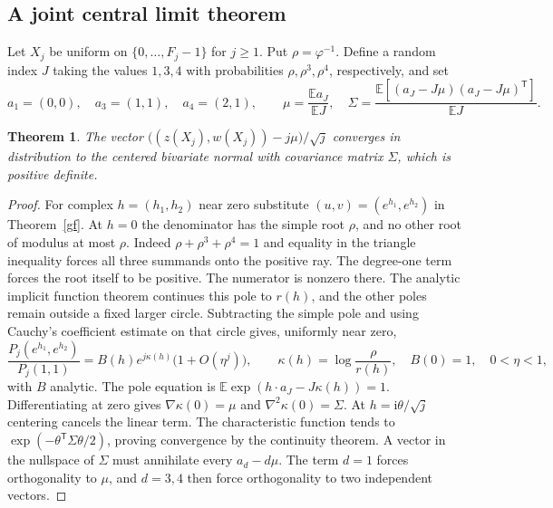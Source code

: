 \documentclass[10pt]{article}
\newtheorem{theorem}{Theorem}[section]
\newcommand{\ph}{\varphi}
\newcommand{\E}{\mathbb E}
\begin{document}
\subsection*{A joint central limit theorem}
Let $X_j$ be uniform on $\{0,\ldots,F_j-1\}$ for $j\ge1$. Put $\rho=\ph^{-1}$. Define a random index $J$ taking the values $1,3,4$ with probabilities $\rho,\rho^3,\rho^4$, respectively, and set
\[
 a_1=(0,0),\quad a_3=(1,1),\quad a_4=(2,1),\qquad
 \mu=\frac{\E a_J}{\E J},\quad
 \Sigma=\frac{\E[(a_J-J\mu)(a_J-J\mu)^{\mathsf T}]}{\E J}.
\]
\begin{theorem}\label{clt}
The vector $\bigl((z(X_j),w(X_j))-j\mu\bigr)/\sqrt{j}$ converges in distribution to the centered bivariate normal with covariance matrix $\Sigma$, which is positive definite.
\end{theorem}
\begin{proof}
For complex $h=(h_1,h_2)$ near zero substitute $(u,v)=(e^{h_1},e^{h_2})$ in Theorem~\ref{gf}. At $h=0$ the denominator has the simple root $\rho$, and no other root of modulus at most $\rho$. Indeed $\rho+\rho^3+\rho^4=1$ and equality in the triangle inequality forces all three summands onto the positive ray. The degree-one term forces the root itself to be positive. The numerator is nonzero there. The analytic implicit function theorem continues this pole to $r(h)$, and the other poles remain outside a fixed larger circle. Subtracting the simple pole and using Cauchy's coefficient estimate on that circle gives, uniformly near zero,
\[
 \frac{P_j(e^{h_1},e^{h_2})}{P_j(1,1)}
   =B(h)e^{j\kappa(h)}\bigl(1+O(\eta^j)\bigr),\qquad
 \kappa(h)=\log\!\frac{\rho}{r(h)},\quad B(0)=1,\quad 0<\eta<1,
\]
with $B$ analytic. The pole equation is $\E\exp(h\cdot a_J-J\kappa(h))=1$.
Differentiating at zero gives $\nabla\kappa(0)=\mu$ and $\nabla^2\kappa(0)=\Sigma$. At $h=\mathrm{i}\theta/\sqrt{j}$ centering cancels the linear term. The characteristic function tends to $\exp(-\theta^{\mathsf T}\Sigma\theta/2)$, proving convergence by the continuity theorem. A vector in the nullspace of $\Sigma$ must annihilate every $a_d-d\mu$. The term $d=1$ forces orthogonality to $\mu$, and $d=3,4$ then force orthogonality to two independent vectors.
\end{proof}

\clearpage
\end{document}
